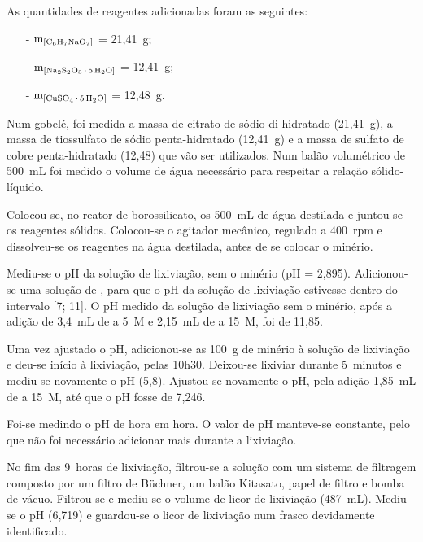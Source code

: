 As quantidades de reagentes adicionadas foram as seguintes:

\begin{itemize}
    \item[-] $\mathrm{m}_{\left[\citratodi{}\right]}$ = 21,41~g;
    \item[-] $\mathrm{m}_{\left[\tsp{}\right]}$ = 12,41~g;
    \item[-] $\mathrm{m}_{\left[\sulfcu{}\right]}$ = 12,48~g.
\end{itemize}

Num gobelé, foi medida a massa de citrato de sódio di-hidratado (21,41~g), a massa de tiossulfato de sódio penta-hidratado (12,41~g) e a massa de sulfato de cobre penta-hidratado (12,48) que vão ser utilizados.
Num balão volumétrico de 500~mL foi medido o volume de água necessário para respeitar a relação sólido-líquido.

Colocou-se, no reator de borossilicato, os 500~mL de água destilada e juntou-se os reagentes sólidos.
Colocou-se o agitador mecânico, regulado a 400~rpm e dissolveu-se os reagentes na água destilada, antes de se colocar o minério.

Mediu-se o pH da solução de lixiviação, sem o minério (pH = 2,895).
Adicionou-se uma solução de \hidso{}, para que o pH da solução de lixiviação estivesse dentro do intervalo [7; 11].
O pH medido da solução de lixiviação sem o minério, após a adição de 3,4~mL de \hidso{} a 5~M e 2,15~mL de \hidso{} a 15~M, foi de 11,85.

Uma vez ajustado o pH, adicionou-se as 100~g de minério à solução de lixiviação e deu-se início à lixiviação, pelas 10h30.
Deixou-se lixiviar durante 5~minutos e mediu-se novamente o pH (5,8).
Ajustou-se novamente o pH, pela adição 1,85~mL de \hidso{} a 15~M, até que o pH fosse de 7,246.

Foi-se medindo o pH de hora em hora. 
O valor de pH manteve-se constante, pelo que não foi necessário adicionar mais \hidso{} durante a lixiviação.

No fim das 9~horas de lixiviação, filtrou-se a solução com um sistema de filtragem composto por um filtro de Büchner, um balão Kitasato, papel de filtro e bomba de vácuo.
Filtrou-se e mediu-se o volume de licor de lixiviação (487~mL). 
Mediu-se o pH (6,719) e guardou-se o licor de lixiviação num frasco devidamente identificado.

